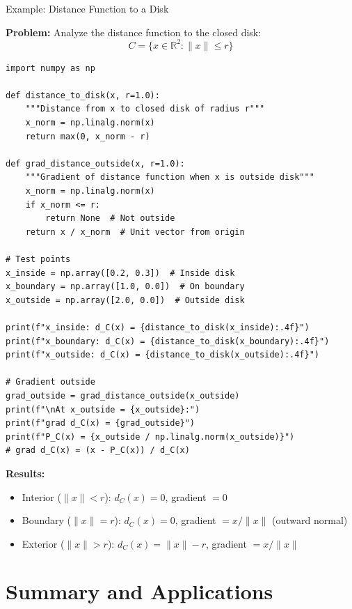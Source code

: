 \documentclass[aspectratio=169,10pt]{beamer}
\theoremstyle{definition}
\begin{document}
\begin{frame}[fragile]{Example: Distance Function to a Disk}

\textbf{Problem:} Analyze the distance function to the closed disk:
$$C = \{x \in \mathbb{R}^2 : \|x\| \leq r\}$$

\vspace{0.3cm}

\begin{lstlisting}
import numpy as np

def distance_to_disk(x, r=1.0):
    """Distance from x to closed disk of radius r"""
    x_norm = np.linalg.norm(x)
    return max(0, x_norm - r)

def grad_distance_outside(x, r=1.0):
    """Gradient of distance function when x is outside disk"""
    x_norm = np.linalg.norm(x)
    if x_norm <= r:
        return None  # Not outside
    return x / x_norm  # Unit vector from origin

# Test points
x_inside = np.array([0.2, 0.3])  # Inside disk
x_boundary = np.array([1.0, 0.0])  # On boundary
x_outside = np.array([2.0, 0.0])  # Outside disk

print(f"x_inside: d_C(x) = {distance_to_disk(x_inside):.4f}")
print(f"x_boundary: d_C(x) = {distance_to_disk(x_boundary):.4f}")
print(f"x_outside: d_C(x) = {distance_to_disk(x_outside):.4f}")

# Gradient outside
grad_outside = grad_distance_outside(x_outside)
print(f"\nAt x_outside = {x_outside}:")
print(f"grad d_C(x) = {grad_outside}")
print(f"P_C(x) = {x_outside / np.linalg.norm(x_outside)}")
# grad d_C(x) = (x - P_C(x)) / d_C(x)
\end{lstlisting}

\textbf{Results:}
\begin{itemize}
  \item Interior ($\|x\| < r$): $d_C(x) = 0$, gradient $= 0$
  \item Boundary ($\|x\| = r$): $d_C(x) = 0$, gradient $= x/\|x\|$ (outward normal)
  \item Exterior ($\|x\| > r$): $d_C(x) = \|x\| - r$, gradient $= x/\|x\|$
\end{itemize}

\end{frame}


\section{Summary and Applications}
\end{document}
